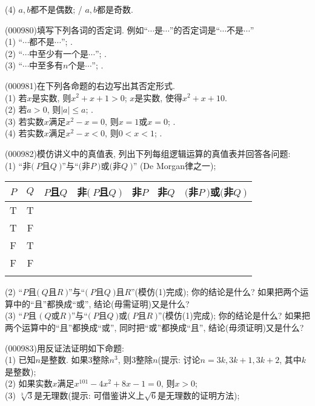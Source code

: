 (4) $a,b$都不是偶数; / $a,b$都是奇数.
\item (000980)填写下列各词的否定词. 例如``$\cdots$是$\cdots$''的否定词是``$\cdots$不是$\cdots$''\\ 
(1) ``$\cdots$都不是$\cdots$''; .\\ 
(2) ``$\cdots$中至少有一个是$\cdots$''; .\\ 
(3) ``$\cdots$中至多有$n$个是$\cdots$''; .
\item (000981)在下列各命题的右边写出其否定形式.\\ 
(1) 若$x$是实数, 则$x^2+x+1>0$; $x$是实数, 使得$x^2+x+1$$0$.\\ 
(2) 若$a>0$, 则$|a|\le a$; .\\ 
(3) 若实数$x$满足$x^2-x=0$, 则$x=1$或$x=0$; .\\ 
(4) 若实数$x$满足$x^2-x<0$, 则$0<x<1$; .
\item (000982)模仿讲义中的真值表, 列出下列每组逻辑运算的真值表并回答各问题:\\ 
(1) ``非$(\ P$且$Q\ )$''与``$($非$P\ )$或$($非$Q\ )$'' (De Morgan律之一);
\begin{center}
\begin{tabular}{|c|c||c|c||c|c|c||}
\hline
$P$ & $Q$ & $P$且$Q$ & 非$(\ P$且$Q\ )$ & 非$P$ & 非$Q$ & $($非$P\ )$或$($非$Q\ )$\\
\hline
T & T &&&&&\\
\hline
T & F &&&&&\\
\hline
F & T &&&&&\\
\hline
F & F &&&&&\\
\hline\\ 
\end{tabular}
\end{center} 
(2) ``$P$且$(\ Q$且$R\ )$''与``$(\ P$且$Q\ )$且$R$''(模仿(1)完成); 你的结论是什么? 如果把两个运算中的``且''都换成``或'', 结论(毋需证明)又是什么?\\ 
(3) ``$P$且 $(\ Q$或$R\ )$''与``$(\ P$且$Q\ )$或$(\ P$且$R\ )$''(模仿(1)完成); 你的结论是什么? 如果把两个运算中的``且''都换成``或'', 同时把``或''都换成``且'', 结论(毋须证明)又是什么?
\item (000983)用反证法证明如下命题:\\ 
(1) 已知$n$是整数. 如果$3$整除$n^3$, 则$3$整除$n$(提示: 讨论$n=3k,3k+1,3k+2$, 其中$k$是整数);\\ 
(2) 如果实数$x$满足$x^{101}-4x^2+8x-1=0$, 则$x>0$;\\ 
(3) $\sqrt[3]{3}$是无理数(提示: 可借鉴讲义上$\sqrt{6}$是无理数的证明方法);\\ 
